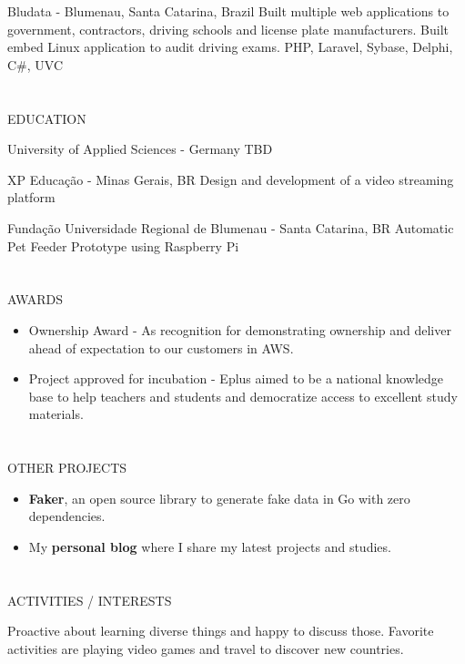 \documentclass{my_cv}
\begin{document}
\begin{multicols}{2}
%
    {Bludata - Blumenau, Santa Catarina, Brazil}%
    {Built multiple web applications to government, contractors, driving schools and license plate manufacturers. Built embed Linux application to audit driving exams.}%
    {PHP, Laravel, Sybase, Delphi, C\#, UVC}%

\columnbreak

\section{\faGraduationCap}{EDUCATION}

{University of Applied Sciences - Germany} %
{TBD}

{XP Educação - Minas Gerais, BR} %
{Design and development of a video streaming platform}

{Fundação Universidade Regional de Blumenau - Santa Catarina, BR} %
{Automatic Pet Feeder Prototype using Raspberry Pi}

\section{\faStar}{AWARDS}

\begin{itemize}[noitemsep]
    \item Ownership Award - As recognition for demonstrating ownership and deliver ahead of expectation to our customers in AWS.
    \item Project approved for incubation - Eplus aimed to be a national knowledge base to help teachers and students and democratize access to excellent study materials.
\end{itemize}

\section{\faBookmark}{OTHER PROJECTS}
\begin{itemize}[noitemsep]
    \item \textbf{Faker}, an open source library to generate fake data in Go with zero dependencies.
    \item My \textbf{personal blog} where I share my latest projects and studies.
\end{itemize}

\section{\faCoffee}{ACTIVITIES / INTERESTS}

Proactive about learning diverse things and happy to discuss those. Favorite activities are playing video games and travel to discover new countries.


\end{multicols}
\end{document}
